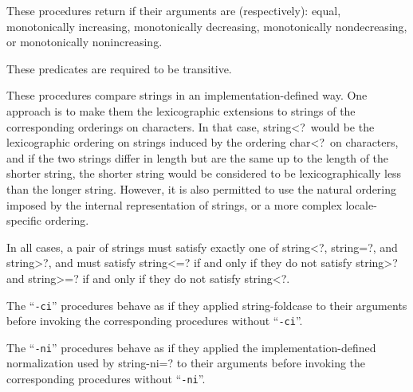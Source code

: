\begin{entry}{%
}

These procedures return \schtrue{} if their arguments are (respectively):
equal, monotonically increasing, monotonically decreasing,
monotonically nondecreasing, or monotonically nonincreasing.

These predicates are required to be transitive.

These procedures compare strings in an implementation-defined way.
One approach is to make them the lexicographic extensions to strings of
the corresponding orderings on characters.  In that case, {\cf string<?}\
would be the lexicographic ordering on strings induced by the ordering
{\cf char<?}\ on characters, and if the two strings differ in length but
are the same up to the length of the shorter string, the shorter string
would be considered to be lexicographically less than the longer string.
However, it is also permitted to use the natural ordering imposed by the
internal representation of strings, or a more complex locale-specific
ordering.

In all cases, a pair of strings must satisfy exactly one of
{\cf string<?}, {\cf string=?}, and {\cf string>?}, and must satisfy
{\cf string<=?} if and only if they do not satisfy {\cf string>?} and
{\cf string>=?} if and only if they do not satisfy {\cf string<?}.

The \hbox{``{\tt -ci}''} procedures behave as if they applied
{\cf string-foldcase} to their arguments before invoking the corresponding
procedures without  \hbox{``{\tt -ci}''}.

The \hbox{``{\tt -ni}''} procedures behave as if they applied the
implementation-defined normalization used by {\cf string-ni=?}
to their arguments before
invoking the corresponding procedures without \hbox{``{\tt -ni}''}.

\end{entry}

